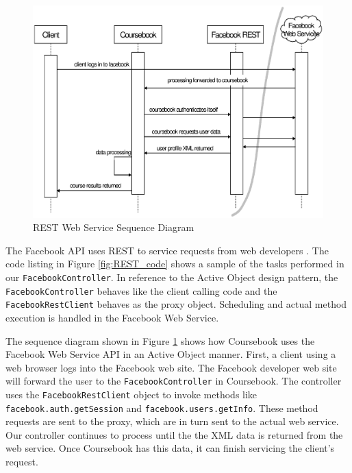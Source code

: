 \begin{figure}[t]
  \begin{center}
  \includegraphics[width=\textwidth]{images/courseBookSequence}
  \caption{REST Web Service Sequence Diagram}
  \label{fig:courseBookSequence}
  \end{center}
\end{figure}

The Facebook API uses REST to service requests from web developers
\cite{Facebook}. The code listing in Figure \ref{fig:REST_code} shows a sample
of the tasks performed in our \verb!FacebookController!. In reference to the
Active Object design pattern, the \verb!FacebookController! behaves like the
client calling code and the \verb!FacebookRestClient! behaves as the proxy
object. Scheduling and actual method execution is handled in the Facebook Web
Service.

The sequence diagram shown in Figure \ref{fig:courseBookSequence} shows how
Coursebook uses the Facebook Web Service API in an Active Object manner. First,
a client using a web browser logs into the Facebook web site. The Facebook
developer web site will forward the user to the \verb!FacebookController! in
Coursebook. The controller uses the \verb!FacebookRestClient! object to invoke
methods like \verb!facebook.auth.getSession! and \verb!facebook.users.getInfo!.
These method requests are sent to the proxy, which are in turn sent to the
actual web service. Our controller continues to process until the the XML data
is returned from the web service. Once Coursebook has this data, it can finish
servicing the client's request.

